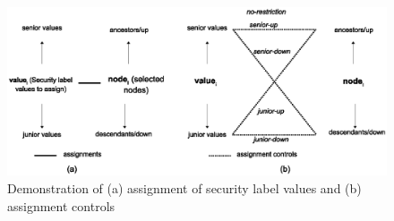 	\begin{figure} [t]
 		\centering
 		\includegraphics[width=1\textwidth]{NSS16/assignment-control}
 		\caption{Demonstration of (a) assignment of security label values and (b) assignment controls}
 		\label{fig:restriction-types}
 	\end{figure}
 